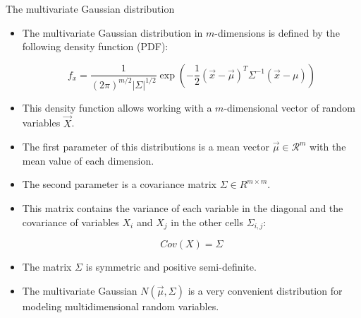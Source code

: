 \documentclass[handout]{beamer}
\begin{document}
\begin{frame}[fragile]{The multivariate Gaussian distribution}
\scriptsize{
\begin{itemize}
 
  \item The multivariate Gaussian distribution in $m$-dimensions is defined by the following density function (PDF):
  
  \begin{displaymath}
   f_x = \frac{1}{(2\pi)^{m/2}|\Sigma|^{1/2}}\exp \left( -\frac{1}{2}(\vec{x}-\vec{\mu})^T  \Sigma^{-1}(\vec{x}-\mu)\right)
  \end{displaymath}

  
\item This density function allows working with a $m$-dimensional vector of random variables $\vec{X}$.


\item The first parameter of this distributions is a mean vector $\vec{\mu} \in \mathcal{R}^m$ with the mean value of each dimension.

\item The second parameter is a covariance matrix $\Sigma \in R^{m\times m}$.

\item This matrix contains the variance of each variable in the diagonal and the covariance of variables $X_i$ and $X_j$ in the other cells $\Sigma_{i,j}$:

\begin{displaymath}
 Cov(X) = \Sigma
\end{displaymath}

\item The matrix $\Sigma$ is symmetric and positive semi-definite.
  
\item The multivariate Gaussian $N(\vec{\mu},\Sigma)$ is a very convenient distribution for modeling multidimensional random variables.
  
  
 
\end{itemize}
 

 
}
\end{frame}
\end{document}
